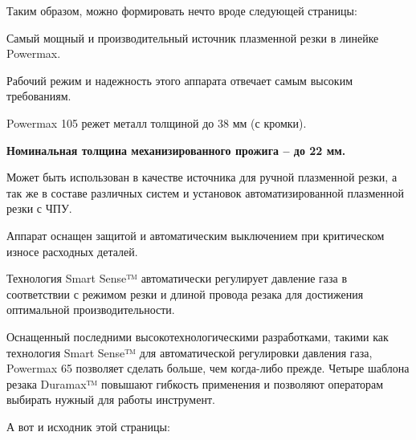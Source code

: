 Таким образом, можно формировать нечто вроде следующей страницы:

\page

\bTABLE
\setupTABLE[column][1][width=\dimexpr(\textwidth/2)]
\setupTABLE[frame=off,align={width,stretch,tolerant,lohi}]
\bTR
\bTD {} \eTD
\bTD
\startitemize
\item Самый мощный и производительный источник плазменной
  резки в линейке Powermax.

\item Рабочий режим и надежность этого аппарата отвечает
  самым высоким требованиям.

\item Powermax 105 режет металл толщиной до 38 мм (с
  кромки).

\item {\bf Номинальная толщина механизированного прожига –
  до 22 мм.}

\stopitemize
\eTD
\eTR
\eTABLE

\blank[1cm]
\bTABLE
\setupTABLE[column][2][width=\dimexpr(\textwidth/2)]
\setupTABLE[frame=off,align={width,stretch,tolerant,lohi}]
\bTR
\bTD
\startitemize
\item Может быть использован в качестве источника для ручной
  плазменной резки, а так же в составе различных систем и
  установок автоматизированной плазменной резки с ЧПУ.

\item Аппарат оснащен защитой и автоматическим выключением
  при критическом износе расходных деталей.

\item Технология Smart Sense™ автоматически регулирует
  давление газа в соответствии с режимом резки и длиной
  провода резака для достижения оптимальной
  производительности.

\stopitemize
\eTD
\bTD \externalfigure[161.png][factor=fit] \eTD
\eTR
\eTABLE

\bigskip
Оснащенный последними высокотехнологическими разработками,
такими как технология Smart Sense™ для автоматической
регулировки давления газа, Powermax 65 позволяет сделать
больше, чем когда-либо прежде. Четыре шаблона резака
Duramax™ повышают гибкость применения и позволяют операторам
выбирать нужный для работы инструмент.

\page

А вот и исходник этой страницы:

